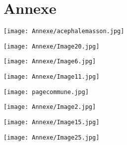 \chapter*{Annexe} 


 \begin{figure*}[htp]
   \centering
   \texttt{[image: Annexe/acephalemasson.jpg]}
	\caption{\cite{memoiremonde}}\label{fig:Acephale}
\end{figure*}


  \begin{figure*}[htp]
   \centering
   \texttt{[image: Annexe/Image20.jpg]}
	\caption{\cite{journallimbour}}\label{fig:limbour2}
    \end{figure*}

  \begin{figure*}[htp]
   \centering
   \texttt{[image: Annexe/Image6.jpg]}
	\caption{\cite{journallimbour}}\label{fig:journallimbour}
    \end{figure*}

    \begin{figure*}[htp]
   \centering
   \texttt{[image: Annexe/Image11.jpg]}
	\caption{\cite{plafondodeon}}\label{fig:odeon}
    \end{figure*}


  \begin{figure*}[htp]
   \centering
   \texttt{[image: pagecommune.jpg]}
	\caption{\cite{commune}}\label{fig:Massoncommune}
    \end{figure*}



   \begin{figure*}[htp]
   \centering
   \texttt{[image: Annexe/Image2.jpg]}
	\caption{\cite{courbetcommunard}}\label{fig:commune}
    \end{figure*}


  \begin{figure*}[htp]
   \centering
   \texttt{[image: Annexe/Image15.jpg]}
	\caption{\cite{courbetcommunard}}\label{fig:courbetcommune}
    \end{figure*}


   \begin{figure*}[htp]
   \centering
   \texttt{[image: Annexe/Image25.jpg]}
	\caption{\cite{peindrefinjeu}}\label{fig:peindrefinjeu}
    \end{figure*}



